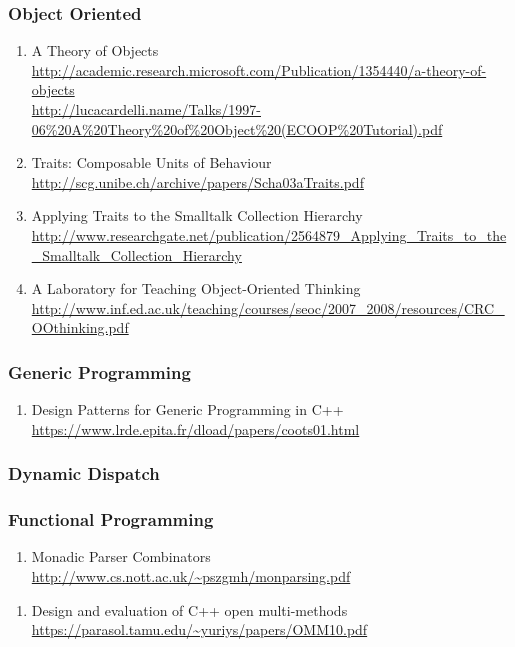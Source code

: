 \documentclass{article}
\begin{document}
\subsubsection{Object Oriented}
\begin{enumerate}
	\item {A Theory of Objects\\
\url{http://academic.research.microsoft.com/Publication/1354440/a-theory-of-objects}\\
\url{http://lucacardelli.name/Talks/1997-06\%20A\%20Theory\%20of\%20Object\%20(ECOOP\%20Tutorial).pdf}}
	\item {Traits: Composable Units of Behaviour\\
\url{http://scg.unibe.ch/archive/papers/Scha03aTraits.pdf}}
	\item {Applying Traits to the Smalltalk Collection Hierarchy\\
\url{http://www.researchgate.net/publication/2564879_Applying_Traits_to_the_Smalltalk_Collection_Hierarchy}}
	\item {A Laboratory for Teaching Object-Oriented Thinking\\
\url{http://www.inf.ed.ac.uk/teaching/courses/seoc/2007_2008/resources/CRC_OOthinking.pdf}}
\end{enumerate}

\subsubsection{Generic Programming}
	\begin{enumerate}
	\item {Design Patterns for Generic Programming in C++\\ \url{https://www.lrde.epita.fr/dload/papers/coots01.html}}
	\end{enumerate}
\subsubsection{Dynamic Dispatch}
\subsubsection{Functional Programming}
\begin{enumerate}
	\item {Monadic Parser Combinators\\
\url{http://www.cs.nott.ac.uk/~pszgmh/monparsing.pdf}}
\end{enumerate}
\begin{enumerate}
	\item {Design and evaluation of C++ open multi-methods\\
\url{https://parasol.tamu.edu/~yuriys/papers/OMM10.pdf}}
\end{enumerate}
\end{document}
